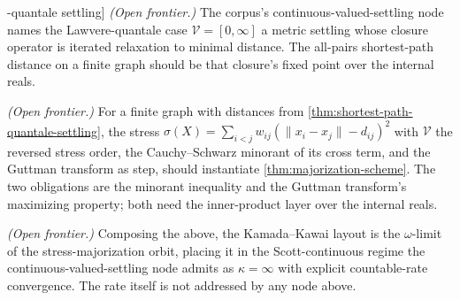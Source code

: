 \begin{theorem}[Shortest-path distance is the \([0,\infty]\)-quantale settling]\label{thm:shortest-path-quantale-settling}\notready{}
\emph{(Open frontier.)} The corpus's continuous-valued-settling node names the Lawvere-quantale case
\(\mathcal{V}=[0,\infty]\) a metric settling whose closure operator is iterated relaxation to
minimal distance. The all-pairs shortest-path distance on a finite graph should be that closure's
fixed point over the internal reals.
\end{theorem}

\begin{theorem}\label{thm:kk-stress-is-majorization-scheme}\notready{}
\emph{(Open frontier.)} For a finite graph with distances from
\ref{thm:shortest-path-quantale-settling}, the stress \(\sigma(X)=\sum_{i<j} w_{ij}(\lVert x_i-x_j
\rVert - d_{ij})^2\) with \(\mathcal{V}\) the reversed stress order, the Cauchy--Schwarz minorant
of its cross term, and the Guttman transform as step, should instantiate
\ref{thm:majorization-scheme}. The two obligations are the minorant inequality and the Guttman
transform's maximizing property; both need the inner-product layer over the internal reals.
\end{theorem}

\begin{theorem}[The Kamada--Kawai layout is a \(\kappa=\omega\) settling]\label{thm:kk-layout-is-scott-settling}\notready{}
\emph{(Open frontier.)} Composing the above, the Kamada--Kawai layout is the \(\omega\)-limit of the
stress-majorization orbit, placing it in the Scott-continuous regime the continuous-valued-settling
node admits as \(\kappa=\infty\) with explicit countable-rate convergence. The rate itself is not
addressed by any node above.
\end{theorem}
